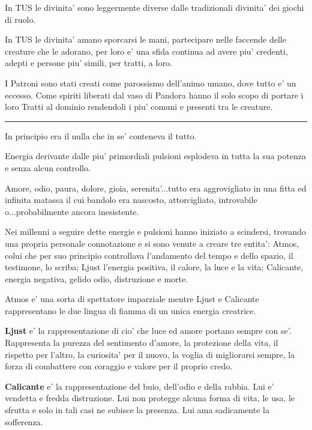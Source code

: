 \documentclass[a4paper,11pt,twoside,openany]{book}
\begin{document}
{		In TUS le divinita' sono leggermente diverse dalle tradizionali divinita' dei giochi di ruolo.
		
		In TUS le divinita' amano sporcarsi le mani, partecipare nelle faccende delle creature che le adorano, per loro e' una sfida continua ad avere piu' credenti, adepti e persone piu' simili, per tratti, a loro.
		
		I Patroni sono stati creati come parossismo dell'animo umano, dove tutto e' un eccesso. Come spiriti liberati dal vaso di Pandora hanno il solo scopo di portare i loro Tratti al dominio rendendoli i piu' comuni e presenti tra le creature.
		
		\noindent\rule{\textwidth}{1pt}
		
		\bigskip
		
		In principio era il nulla che in se' conteneva il tutto.
		
		Energia derivante dalle piu' primordiali pulsioni esplodeva in tutta la sua potenza e senza alcun controllo.
		
		Amore, odio, paura, dolore, gioia, serenita'...tutto era aggrovigliato in una fitta ed infinita matassa il cui bandolo era nascosto, attorcigliato, introvabile o...probabilmente ancora inesistente.
		
		Nei millenni a seguire dette energie e pulsioni hanno iniziato a scindersi, trovando una propria personale connotazione e si sono venute a creare tre entita': Atmos, colui che per suo principio controllava l'andamento del tempo e dello spazio, il testimone, lo scriba; Ljust l'energia positiva, il calore, la luce e la vita; Calicante, energia negativa, gelido odio, distruzione e morte.
		
		Atmos e' una sorta di spettatore imparziale mentre Ljust e Calicante rappresentano le due lingua di fiamma di un unica energia creatrice.
		
		\textbf{Ljust} e' la rappresentazione di cio' che luce ed amore portano sempre con se'. Rappresenta la purezza del sentimento d'amore, la protezione della vita, il rispetto per l'altro, la curiosita' per il nuovo, la voglia di migliorarsi sempre, la forza di combattere con coraggio e valore per il proprio credo.
		
		\textbf{Calicante} e' la rappresentazione del buio, dell'odio e della rabbia. Lui e' vendetta e fredda distruzione. Lui non protegge alcuna forma di vita, le usa, le sfrutta e solo in tali casi ne subisce la presenza. Lui ama sadicamente la sofferenza. 
		
}
\end{document}
